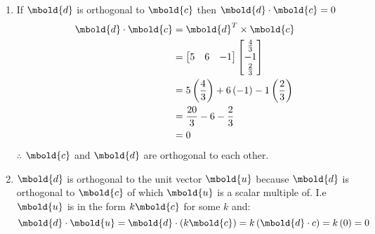 \documentclass[12pt letter]{report}
\begin{document}
{\begin{enumerate}
\begin{align*}
{            + \left( \frac{2\sqrt{29} }{29} \right) ^2}                                                                                                                                                                  \\
                          & = 1                                                                                                                                                                                          \\
          \end{align*}
    \item
          If $\mbold{d}$ is orthogonal to $\mbold{c}$ then $\mbold{d} \cdot \mbold{c} = 0$
          \begin{align*}
            \mbold{d} \cdot \mbold{c} & = \mbold{d}^{T} \times \mbold{c}                                                                          \\
                                      & = \begin{bmatrix} 5 & 6 & -1 \end{bmatrix} \begin{bmatrix} \frac{4}{3} \\ -1 \\ \frac{2}{3} \end{bmatrix} \\
                                      & = 5 \left( \frac{4}{3} \right) + 6 \left( -1 \right)  -1 \left( \frac{2}{3} \right)                       \\
                                      & = \frac{20}{3} - 6 - \frac{2}{3}                                                                          \\
                                      & = 0                                                                                                       \\
          \end{align*}
          $\therefore$ $\mbold{c}$ and $\mbold{d}$ are orthogonal to each other.
    \item $\mbold{d}$ is orthogonal to the unit vector $\mbold{u}$ because $\mbold{d}$ is orthogonal to $\mbold{c}$
          of which $\mbold{u}$ is a scalar multiple of. I.e $\mbold{u}$ is in the form $k \mbold{c}$ for some $k$ and:
          \[
            \mbold{d}\cdot \mbold{u} = \mbold{d} \cdot \left( k \mbold{c} \right) =  k \left( \mbold{d}\cdot c \right) = k
            \left( 0 \right) = 0
          \]
  \end{enumerate}
}
\end{document}
